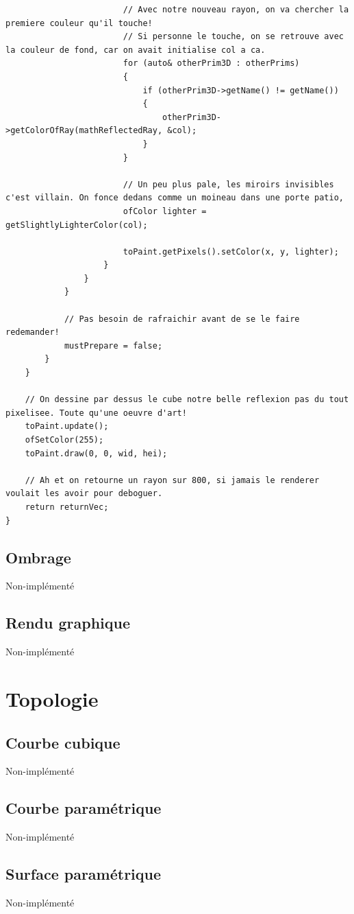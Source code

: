 \begin{lstlisting}
						// Avec notre nouveau rayon, on va chercher la premiere couleur qu'il touche!
						// Si personne le touche, on se retrouve avec la couleur de fond, car on avait initialise col a ca.
						for (auto& otherPrim3D : otherPrims)
						{
							if (otherPrim3D->getName() != getName())
							{
								otherPrim3D->getColorOfRay(mathReflectedRay, &col);
							}
						}
						
						// Un peu plus pale, les miroirs invisibles c'est villain. On fonce dedans comme un moineau dans une porte patio,
						ofColor lighter = getSlightlyLighterColor(col);
						
						toPaint.getPixels().setColor(x, y, lighter);
					}
				}
			}
			
			// Pas besoin de rafraichir avant de se le faire redemander!
			mustPrepare = false;
		}
	}
	
	// On dessine par dessus le cube notre belle reflexion pas du tout pixelisee. Toute qu'une oeuvre d'art!
	toPaint.update();
	ofSetColor(255);
	toPaint.draw(0, 0, wid, hei);
	
	// Ah et on retourne un rayon sur 800, si jamais le renderer voulait les avoir pour deboguer.
	return returnVec;
}
\end{lstlisting}

\newpage

\subsection{Ombrage}
Non-implémenté

\newpage

\subsection{Rendu graphique}
Non-implémenté

\pagebreak
\section{Topologie}
\subsection{Courbe cubique}
Non-implémenté

\subsection{Courbe paramétrique}
Non-implémenté

\subsection{Surface paramétrique}
Non-implémenté

